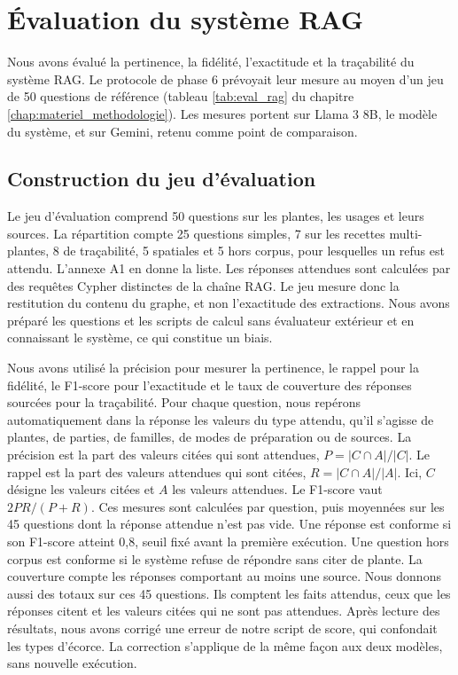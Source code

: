 
\section{Évaluation du système RAG}
\label{sec:res_rag}

Nous avons évalué la pertinence, la fidélité, l'exactitude et la traçabilité du système RAG. Le protocole de phase 6 prévoyait leur mesure au moyen d'un jeu de 50 questions de référence (tableau \ref{tab:eval_rag} du chapitre \ref{chap:materiel_methodologie}). Les mesures portent sur Llama 3 8B, le modèle du système, et sur Gemini, retenu comme point de comparaison.

\subsection{Construction du jeu d'évaluation}
\label{subsec:res_jeu_50}

Le jeu d'évaluation comprend 50 questions sur les plantes, les usages et leurs sources. La répartition compte 25 questions simples, 7 sur les recettes multi-plantes, 8 de traçabilité, 5 spatiales et 5 hors corpus, pour lesquelles un refus est attendu. L'annexe A1 en donne la liste. Les réponses attendues sont calculées par des requêtes Cypher distinctes de la chaîne RAG. Le jeu mesure donc la restitution du contenu du graphe, et non l'exactitude des extractions. Nous avons préparé les questions et les scripts de calcul sans évaluateur extérieur et en connaissant le système, ce qui constitue un biais.

Nous avons utilisé la précision pour mesurer la pertinence, le rappel pour la fidélité, le F1-score pour l'exactitude et le taux de couverture des réponses sourcées pour la traçabilité. Pour chaque question, nous repérons automatiquement dans la réponse les valeurs du type attendu, qu'il s'agisse de plantes, de parties, de familles, de modes de préparation ou de sources. La précision est la part des valeurs citées qui sont attendues, $P = |C \cap A| / |C|$. Le rappel est la part des valeurs attendues qui sont citées, $R = |C \cap A| / |A|$. Ici, $C$ désigne les valeurs citées et $A$ les valeurs attendues. Le F1-score vaut $2PR / (P + R)$. Ces mesures sont calculées par question, puis moyennées sur les 45 questions dont la réponse attendue n'est pas vide. Une réponse est conforme si son F1-score atteint 0,8, seuil fixé avant la première exécution. Une question hors corpus est conforme si le système refuse de répondre sans citer de plante. La couverture compte les réponses comportant au moins une source. Nous donnons aussi des totaux sur ces 45 questions. Ils comptent les faits attendus, ceux que les réponses citent et les valeurs citées qui ne sont pas attendues. Après lecture des résultats, nous avons corrigé une erreur de notre script de score, qui confondait les types d'écorce. La correction s'applique de la même façon aux deux modèles, sans nouvelle exécution.

